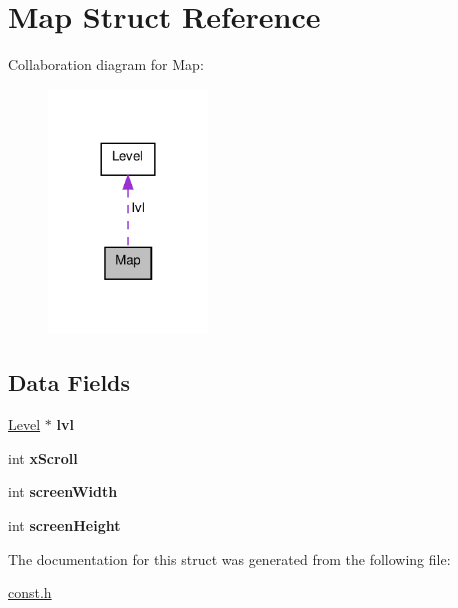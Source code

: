 \hypertarget{struct_map}{\section{Map Struct Reference}
\label{struct_map}
}


Collaboration diagram for Map\-:\nopagebreak
\begin{figure}[H]
\begin{center}
\leavevmode
\includegraphics[width=120pt]{struct_map__coll__graph}
\end{center}
\end{figure}
\subsection*{Data Fields}
\begin{DoxyCompactItemize}
\item 
\hypertarget{struct_map_abca19b7de8e60347a507d1aeff95c764}{\hyperlink{struct_level}{Level} $\ast$ {\bfseries lvl}}\label{struct_map_abca19b7de8e60347a507d1aeff95c764}

\item 
\hypertarget{struct_map_aa83bbdf2603e42824cd0bab44bf315c2}{int {\bfseries x\-Scroll}}\label{struct_map_aa83bbdf2603e42824cd0bab44bf315c2}

\item 
\hypertarget{struct_map_ae50cb92a78d9e0a4f4bd718fc02bd294}{int {\bfseries screen\-Width}}\label{struct_map_ae50cb92a78d9e0a4f4bd718fc02bd294}

\item 
\hypertarget{struct_map_a9ebc1dbd77788c4bfa27758a6725413f}{int {\bfseries screen\-Height}}\label{struct_map_a9ebc1dbd77788c4bfa27758a6725413f}

\end{DoxyCompactItemize}


The documentation for this struct was generated from the following file\-:\begin{DoxyCompactItemize}
\item 
\hyperlink{const_8h}{const.\-h}\end{DoxyCompactItemize}
